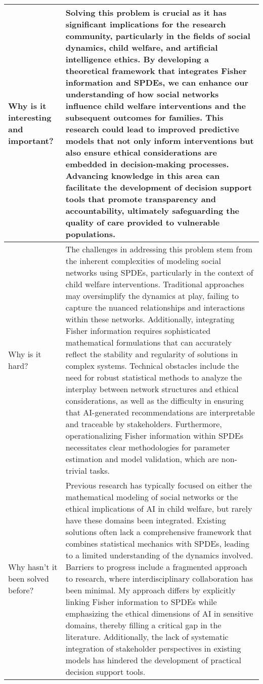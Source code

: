 \begin{table*}[htbp]
\begin{tabular}{p{3.5cm}p{12cm}}
Why is it interesting and important? & 
Solving this problem is crucial as it has significant implications for the research community, particularly in the fields of social dynamics, child welfare, and artificial intelligence ethics. By developing a theoretical framework that integrates Fisher information and SPDEs, we can enhance our understanding of how social networks influence child welfare interventions and the subsequent outcomes for families. This research could lead to improved predictive models that not only inform interventions but also ensure ethical considerations are embedded in decision-making processes. Advancing knowledge in this area can facilitate the development of decision support tools that promote transparency and accountability, ultimately safeguarding the quality of care provided to vulnerable populations.\\ \midrule
Why is it hard? & 
The challenges in addressing this problem stem from the inherent complexities of modeling social networks using SPDEs, particularly in the context of child welfare interventions. Traditional approaches may oversimplify the dynamics at play, failing to capture the nuanced relationships and interactions within these networks. Additionally, integrating Fisher information requires sophisticated mathematical formulations that can accurately reflect the stability and regularity of solutions in complex systems. Technical obstacles include the need for robust statistical methods to analyze the interplay between network structures and ethical considerations, as well as the difficulty in ensuring that AI-generated recommendations are interpretable and traceable by stakeholders. Furthermore, operationalizing Fisher information within SPDEs necessitates clear methodologies for parameter estimation and model validation, which are non-trivial tasks.
\\ \midrule
Why hasn't it been solved before? & 
Previous research has typically focused on either the mathematical modeling of social networks or the ethical implications of AI in child welfare, but rarely have these domains been integrated. Existing solutions often lack a comprehensive framework that combines statistical mechanics with SPDEs, leading to a limited understanding of the dynamics involved. Barriers to progress include a fragmented approach to research, where interdisciplinary collaboration has been minimal. My approach differs by explicitly linking Fisher information to SPDEs while emphasizing the ethical dimensions of AI in sensitive domains, thereby filling a critical gap in the literature. Additionally, the lack of systematic integration of stakeholder perspectives in existing models has hindered the development of practical decision support tools.

\end{tabular}
\end{table*}

